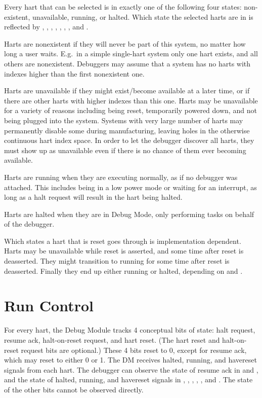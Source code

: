 Every hart that can be selected is in exactly one of the following four states:
non-existent, unavailable, running, or halted. Which state
the selected harts are in is reflected by \Fallnonexistent, \Fanynonexistent,
\Fallunavail, \Fanyunavail, \Fallrunning, \Fanyrunning, \Fallhalted, and
\Fanyhalted.

Harts are nonexistent if they will never be part of this system, no matter how
long a user waits. E.g.\ in a simple single-hart system only one hart exists,
and all others are nonexistent. Debuggers may assume that a system has no harts
with indexes higher than the first nonexistent one.

Harts are unavailable if they might exist/become available at a later time, or
if there are other harts with higher indexes than this one. Harts may be
unavailable for a variety of reasons including being reset, temporarily powered
down, and not being plugged into the system.
Systems with very large number of harts may
permanently disable some during manufacturing, leaving holes in the otherwise
continuous hart index space. In order to let the debugger discover all harts,
they must show up as unavailable even if there is no chance of them ever
becoming available.

Harts are running when they are executing normally, as if no debugger was
attached. This includes being in a low power mode or waiting for an interrupt,
as long as a halt request will result in the hart being halted.

Harts are halted when they are in Debug Mode, only performing tasks on behalf
of the debugger.

Which states a hart that is reset goes through is implementation dependent.
Harts may be unavailable while reset is asserted, and some time after reset is
deasserted. They might transition to running for some time after reset is
deasserted. Finally they end up either running or halted, depending on
\Fhaltreq and \Fresethaltreq.

\section{Run Control} \label{runcontrol}

For every hart, the Debug Module tracks 4 conceptual bits of state: halt
request, resume ack, halt-on-reset request,  and hart reset.
(The hart reset and halt-on-reset request bits are optional.)
These 4 bits reset to 0, except for resume ack, which may reset to either 0 or 1.
The DM receives halted, running, and havereset signals from each hart.
The debugger can observe the state of resume ack in \Fallresumeack and
\Fanyresumeack, and the state of halted, running, and havereset signals
in \Fallhalted, \Fanyhalted, \Fallrunning, \Fanyrunning, \Fallhavereset,
and \Fanyhavereset. The state of the other bits cannot be observed directly.

